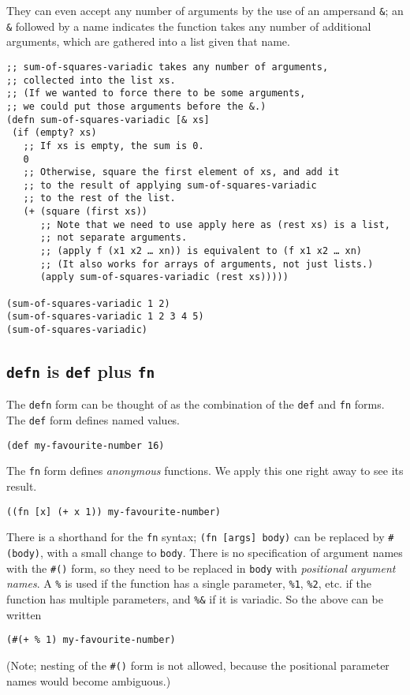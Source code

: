 \documentclass[11pt]{article}
\begin{document}
They can even accept any number of arguments
by the use of an ampersand \texttt{\&}; an \texttt{\&} followed by a name
indicates the function takes any number of additional arguments,
which are gathered into a list given that name.
\begin{verbatim}
;; sum-of-squares-variadic takes any number of arguments,
;; collected into the list xs.
;; (If we wanted to force there to be some arguments,
;; we could put those arguments before the &.)
(defn sum-of-squares-variadic [& xs]
 (if (empty? xs)
   ;; If xs is empty, the sum is 0.
   0
   ;; Otherwise, square the first element of xs, and add it
   ;; to the result of applying sum-of-squares-variadic
   ;; to the rest of the list.
   (+ (square (first xs))
      ;; Note that we need to use apply here as (rest xs) is a list,
      ;; not separate arguments.
      ;; (apply f (x1 x2 … xn)) is equivalent to (f x1 x2 … xn)
      ;; (It also works for arrays of arguments, not just lists.)
      (apply sum-of-squares-variadic (rest xs)))))

(sum-of-squares-variadic 1 2)
(sum-of-squares-variadic 1 2 3 4 5)
(sum-of-squares-variadic)
\end{verbatim}

\subsection{\texttt{defn} is \texttt{def} plus \texttt{fn}}
\label{sec:org378f244}
The \texttt{defn} form can be thought of
as the combination of the \texttt{def} and \texttt{fn} forms.
The \texttt{def} form defines named values.
\begin{verbatim}
(def my-favourite-number 16)
\end{verbatim}

The \texttt{fn} form defines \emph{anonymous} functions.
We apply this one right away to see its result.
\begin{verbatim}
((fn [x] (+ x 1)) my-favourite-number)
\end{verbatim}

There is a shorthand for the \texttt{fn} syntax; \texttt{(fn [args] body)} can be
replaced by \texttt{\#(body)}, with a small change to \texttt{body}.
There is no specification of argument names with the \texttt{\#()} form,
so they need to be replaced in \texttt{body} with \emph{positional argument names}.
A \texttt{\%} is used if the function has a single parameter, \texttt{\%1}, \texttt{\%2}, etc.
if the function has multiple parameters, and \texttt{\%\&} if it is variadic.
So the above can be written
\begin{verbatim}
(#(+ % 1) my-favourite-number)
\end{verbatim}
(Note; nesting of the \texttt{\#()} form is not allowed, because the
positional parameter names would become ambiguous.)
\end{document}
